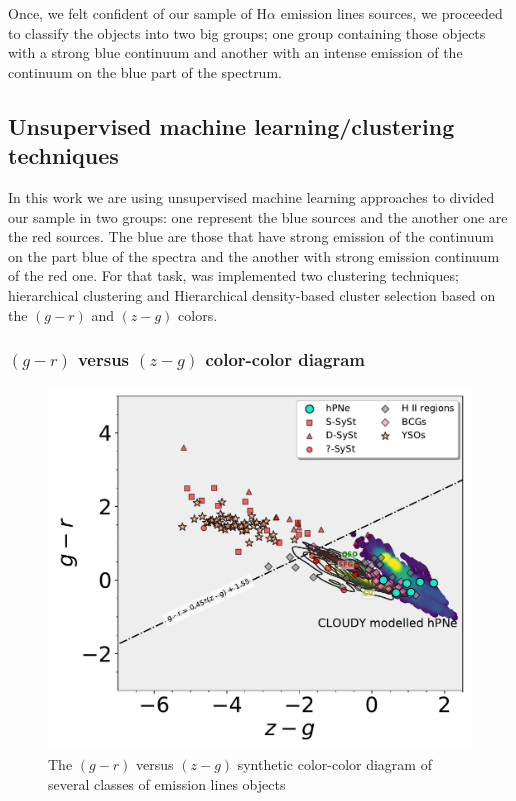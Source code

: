 \documentclass[fleqn,usenatbib]{mnras}
\begin{document}
Once, we felt confident of our sample of H{$\alpha$} emission lines sources,
we proceeded to classify the objects into two big groups; one group containing those
objects with a strong blue continuum and another with an intense emission of the
continuum on the blue part of the spectrum. 


\subsection{Unsupervised machine learning/clustering techniques}
\label{sec:clustering}

In this work we are using unsupervised machine learning approaches to divided our sample
in two groups: one represent the blue sources and the another one are the red sources.
The blue are those that have strong emission of the continuum on the part blue of the
spectra and the another with strong emission continuum of the red one. For that task,
was implemented two clustering techniques; hierarchical clustering and Hierarchical
density-based cluster selection based on the $(g - r)$ and $(z - g)$ colors.

\subsubsection{$(g - r)$ versus $(z - g)$ color-color diagram}

\begin{figure}
	\includegraphics[width=0.9\linewidth]{Figs/Fig-SPLUS-gr-zg.pdf}
        \caption{The $(g - r)$ versus $(z - g)$ synthetic color-color diagram of several
          classes of emission lines objects}
    \label{fig:synthetic}
\end{figure}
\end{document}
